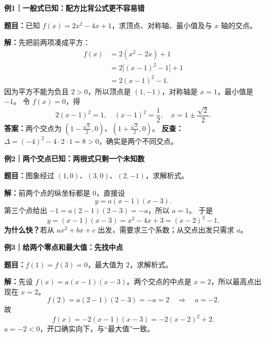 \clearpage
\begin{examplebox}
\textbf{\textcolor{CExample}{例1｜一般式已知：配方比背公式更不容易错}}


\textbf{题目：}已知 $f(x)=2x^2-4x+1$，求顶点、对称轴、最小值及与 $x$ 轴的交点。

\textbf{解：}先把前两项凑成平方：
\[
\begin{aligned}
f(x)&=2(x^2-2x)+1\\
&=2\bigl[(x-1)^2-1\bigr]+1\\
&=2(x-1)^2-1.
\end{aligned}
\]
因为平方不能为负且 $2>0$，所以顶点是 $(1,-1)$，对称轴是 $x=1$，最小值是 $-1$。
令 $f(x)=0$，得
\[
2(x-1)^2=1,\quad (x-1)^2=\frac12,
\quad x=1\pm\frac{\sqrt2}{2}.
\]
\textbf{答案：}两个交点为 $\left(1-\frac{\sqrt2}{2},0\right)$、$\left(1+\frac{\sqrt2}{2},0\right)$。
\textbf{反查：}$\Delta=(-4)^2-4\cdot2\cdot1=8>0$，确实是两个不同交点。

\medskip

\end{examplebox}
\clearpage
\begin{examplebox}
\textbf{\textcolor{CExample}{例2｜两个交点已知：两根式只剩一个未知数}}


\textbf{题目：}图象经过 $(1,0)$、$(3,0)$、$(2,-1)$，求解析式。

\textbf{解：}前两个点的纵坐标都是 $0$，直接设
\[
y=a(x-1)(x-3).
\]
第三个点给出 $-1=a(2-1)(2-3)=-a$，所以 $a=1$。
于是
\[
\boxed{y=(x-1)(x-3)=x^2-4x+3=(x-2)^2-1.}
\]
\textbf{为什么快？}若从 $ax^2+bx+c$ 出发，需要求三个系数；从交点出发只需求 $a$。

\medskip

\end{examplebox}
\clearpage
\begin{examplebox}
\textbf{\textcolor{CExample}{例3｜给两个零点和最大值：先找中点}}


\textbf{题目：}$f(1)=f(3)=0$，最大值为 $2$，求解析式。

\textbf{解：}先设 $f(x)=a(x-1)(x-3)$。两个交点的中点是 $x=2$，所以最高点出现在 $x=2$。
\[
f(2)=a(2-1)(2-3)=-a=2
\quad\Longrightarrow\quad a=-2.
\]
故
\[
\boxed{f(x)=-2(x-1)(x-3)=-2(x-2)^2+2.}
\]
$a=-2<0$，开口确实向下，与“最大值”一致。

\medskip

\end{examplebox}
\clearpage
